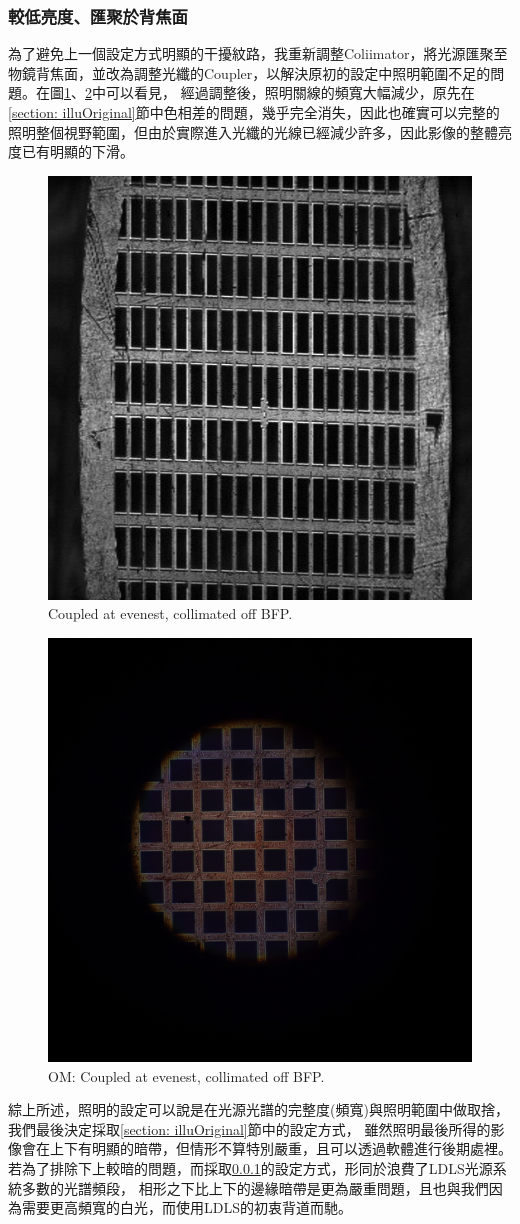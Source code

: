 \documentclass[12pt]{article}
\begin{document}
    \subsubsection{較低亮度、匯聚於背焦面} \label{illuDark}
    為了避免上一個設定方式明顯的干擾紋路，我重新調整Coliimator，將光源匯聚至物鏡背焦面，並改為調整光纖的Coupler，以解決原初的設定中照明範圍不足的問題。在圖\ref{figure: evenest_on}、\ref{figure: om_evenest_on}中可以看見，
    經過調整後，照明關線的頻寬大幅減少，原先在\ref{section: illuOriginal}節中色相差的問題，幾乎完全消失，因此也確實可以完整的照明整個視野範圍，但由於實際進入光纖的光線已經減少許多，因此影像的整體亮度已有明顯的下滑。
    \begin{figure}
        \centering
        \includegraphics[width=0.5\linewidth]{on_evenest.jpg}
        \caption{Coupled at evenest, collimated off BFP.}
        \label{figure: evenest_on}
    \end{figure}
    \begin{figure}
        \centering
        \includegraphics[width=0.5\linewidth]{om_on_evenest.JPG}
        \caption{OM: Coupled at evenest, collimated off BFP.}
        \label{figure: om_evenest_on}
    \end{figure}
    
    \noindent 綜上所述，照明的設定可以說是在光源光譜的完整度(頻寬)與照明範圍中做取捨，我們最後決定採取\ref{section: illuOriginal}節中的設定方式，
    雖然照明最後所得的影像會在上下有明顯的暗帶，但情形不算特別嚴重，且可以透過軟體進行後期處裡。若為了排除下上較暗的問題，而採取\ref{illuDark}的設定方式，形同於浪費了LDLS光源系統多數的光譜頻段，
    相形之下比上下的邊緣暗帶是更為嚴重問題，且也與我們因為需要更高頻寬的白光，而使用LDLS的初衷背道而馳。
\end{document}
